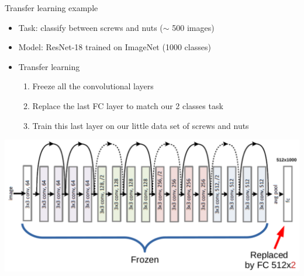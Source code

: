 \documentclass[usenames,dvipsnames]{beamer}
\begin{document}
    \begin{frame}{\secname}{\subsecname}
        Transfer learning example
        \begin{itemize}
            \item Task: classify between screws and nuts ($\sim$ 500 images)
            \item Model: ResNet-18 trained on ImageNet (1000 classes)
            \item Transfer learning
            \begin{enumerate}
                \item Freeze all the convolutional layers
                \item Replace the last FC layer to match our 2 classes task
                \item Train this last layer on our little data set of screws and nuts
            \end{enumerate}
        \end{itemize}
        \vspace{-1em}
        \begin{center}
            \includegraphics[width=0.82\linewidth]{figures/Going_deeper/transfer_learning.pdf}\\\vspace{-0.8em}
        \end{center}
    \end{frame}
    
\end{document}
